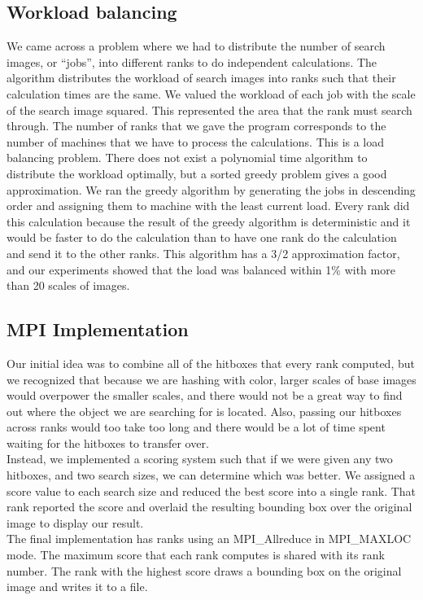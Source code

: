 \documentclass[10pt, journal]{vgtc}                %
\begin{document}
\subsection{Workload balancing}
We came across a problem where we had to distribute the number of search images, or “jobs”, into different ranks to do independent calculations. The algorithm distributes the workload of search images into ranks such that their calculation times are the same. We valued the workload of each job with the scale of the search image squared. This represented the area that the rank must search through. The number of ranks that we gave the program corresponds to the number of machines that we have to process the calculations. This is a load balancing problem. There does not exist a polynomial time algorithm to distribute the workload optimally, but a sorted greedy problem gives a good approximation. We ran the greedy algorithm by generating the jobs in descending order and assigning them to machine with the least current load. Every rank did this calculation because the result of the greedy algorithm is deterministic and it would be faster to do the calculation than to have one rank do the calculation and send it to the other ranks. This algorithm has a 3/2 approximation factor, and our experiments showed that the load was balanced within 1\% with more than 20 scales of images.  

\subsection{MPI Implementation}
Our initial idea was to combine all of the hitboxes that every rank computed, but we recognized that because we are hashing with color, larger scales of base images would overpower the smaller scales, and there would not be a great way to find out where the object we are searching for is located. Also, passing our hitboxes across ranks would too take too long and there would be a lot of time spent waiting for the hitboxes to transfer over. \\
Instead, we implemented a scoring system such that if we were given any two hitboxes, and two search sizes, we can determine which was better. We assigned a score value to each search size and reduced the best score into a single rank. That rank reported the score and overlaid the resulting bounding box over the original image to display our result. \\
The final implementation has ranks using an MPI\_Allreduce in MPI\_MAXLOC mode. The maximum score that each rank computes is shared with its rank number. The rank with the highest score draws a bounding box on the original image and writes it to a file.
\end{document}
